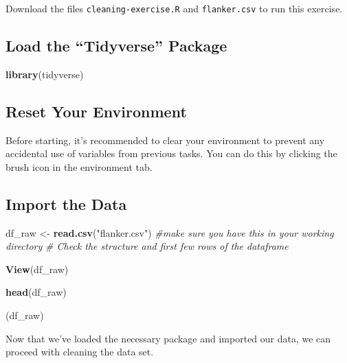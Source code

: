 \documentclass[
]{book}
\newenvironment{Shaded}{\begin{snugshade}}{\end{snugshade}}
\newcommand{\CommentTok}[1]{\textcolor[rgb]{0.56,0.35,0.01}{\textit{#1}}}
\newcommand{\FunctionTok}[1]{\textcolor[rgb]{0.13,0.29,0.53}{\textbf{#1}}}
\newcommand{\NormalTok}[1]{#1}
\newcommand{\OtherTok}[1]{\textcolor[rgb]{0.56,0.35,0.01}{#1}}
\newcommand{\StringTok}[1]{\textcolor[rgb]{0.31,0.60,0.02}{#1}}
\begin{document}
Download the files \texttt{cleaning-exercise.R} and \texttt{flanker.csv} to run this exercise.

\hypertarget{load-the-tidyverse-package}{%
\subsection{\texorpdfstring{\textbf{Load the ``Tidyverse'' Package}}{Load the ``Tidyverse'' Package}}\label{load-the-tidyverse-package}}

\begin{Shaded}
\begin{Highlighting}[]
\FunctionTok{library}\NormalTok{(tidyverse)}
\end{Highlighting}
\end{Shaded}

\hypertarget{reset-your-environment}{%
\subsection{\texorpdfstring{\textbf{Reset Your Environment}}{Reset Your Environment}}\label{reset-your-environment}}

Before starting, it's recommended to clear your environment to prevent any accidental use of variables from previous tasks. You can do this by clicking the brush icon in the environment tab.

\hypertarget{import-the-data}{%
\subsection{\texorpdfstring{\textbf{Import the Data}}{Import the Data}}\label{import-the-data}}

\begin{Shaded}
\begin{Highlighting}[]
\NormalTok{df\_raw }\OtherTok{\textless{}{-}} \FunctionTok{read.csv}\NormalTok{(}\StringTok{"flanker.csv"}\NormalTok{) }\CommentTok{\#make sure you have this in your working directory  }
\CommentTok{\# Check the structure and first few rows of the dataframe }

\FunctionTok{View}\NormalTok{(df\_raw) }

\FunctionTok{head}\NormalTok{(df\_raw)  }

\NormalTok{(df\_raw)}
\end{Highlighting}
\end{Shaded}

Now that we've loaded the necessary package and imported our data, we can proceed with cleaning the data set.
\end{document}
